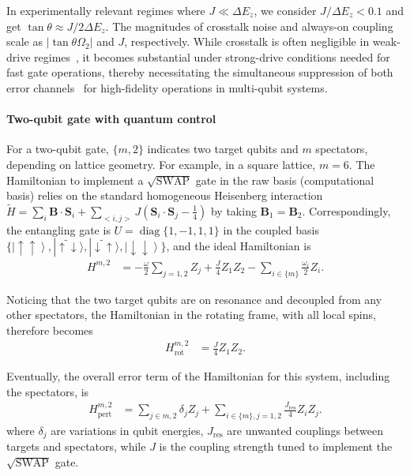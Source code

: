 \documentclass[12pt]{article}
\begin{document}
In experimentally relevant regimes where $J \ll \Delta E_z$, we consider $J/\Delta E_z < 0.1$ and get $\tan \theta \approx J/2\Delta E_z$. The magnitudes of crosstalk noise and always-on coupling scale as $|\tan\theta \Omega_2|$ and $J$, respectively.
While crosstalk is often negligible in weak-drive regimes~\cite{russ2018high, gungordu2020robust, kanaar2021single}, it becomes substantial under strong-drive conditions needed for fast gate operations, thereby necessitating the simultaneous suppression of both error channels~\cite{heinz2024analysis, mkadzik2022precision} for high-fidelity operations in multi-qubit systems.

\paragraph*{Two-qubit gate with quantum control}
For a two-qubit gate, $\{m,2\}$ indicates two target qubits and $m$ spectators, depending on lattice geometry. For example, in a square lattice, $m=6$. The Hamiltonian to implement a $\sqrt{\mathrm{SWAP}}$ gate \cite{he2019two} in the raw basis (computational basis) relies on the standard homogeneous Heisenberg interaction $\tilde{H}= \sum_i\mathbf{B} \cdot \mathbf{S}_i + \sum_{<i,j>}J
  \left( \mathbf{S}_i \cdot \mathbf{S}_j - \frac{1}{4} \right)$ by taking $\mathbf{B}_1=\mathbf{B}_2$. Correspondingly, the entangling gate is $U=\operatorname{diag}\{1,-1,1,1\}$ in the coupled basis $\{\left|\uparrow \uparrow \right\rangle, |\tilde{\uparrow \downarrow}\rangle, |\tilde{\downarrow \uparrow}\rangle, \left|\downarrow \downarrow \right\rangle\}$, and the ideal Hamiltonian is
\begin{equation}
    \begin{aligned}
       H^{m,2} &= -\frac{\omega}{2} \sum_{j=1,2} Z_j + \frac{J}{4} Z_1 Z_2 - \sum_{i \in \{m\}}\frac{\omega_i}{2} Z_i.
    \end{aligned}
\end{equation}

Noticing that the two target qubits are on resonance and decoupled from any other spectators, the Hamiltonian in the rotating frame, with all local spins, therefore becomes
\begin{equation}
    \begin{aligned}
       H_{\text{rot}}^{m,2} &= \frac{J}{4} Z_1 Z_2.
    \end{aligned}
    \label{eq:2qubit_rot}
\end{equation}

Eventually, the overall error term of the Hamiltonian for this system, including the spectators, is
\begin{equation}
    \begin{aligned}
       H_{\text{pert}}^{m,2} &=\sum_{j\in{m,2}} \delta_j Z_j + \sum_{i \in \{m\}, j=1,2}\frac{J_{\mathrm{res}}}{4} Z_i Z_j.
       \label{eq:2qubit_per}
    \end{aligned}
\end{equation}
where $\delta_j$ are variations in qubit energies, $J_{\mathrm{res}}$ are unwanted couplings between targets and spectators, while $J$ is the coupling strength tuned to implement the $\sqrt{\mathrm{SWAP}}$ gate. 
        
\end{document}
